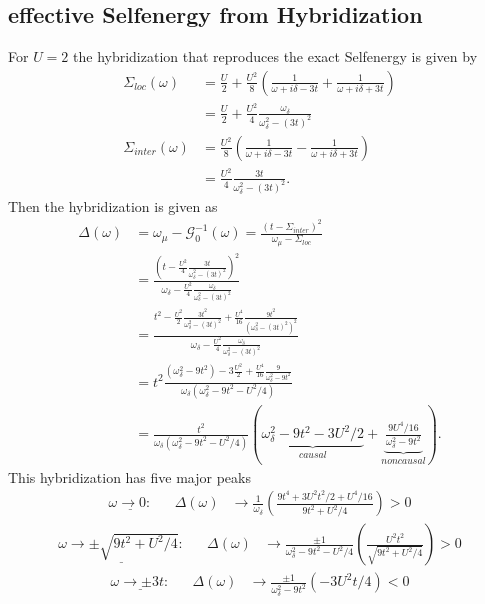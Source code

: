 \documentclass[12pt,a4paper]{scrartcl}
\numberwithin{equation}{section}
\begin{document}
\subsection{effective Selfenergy from Hybridization}
For $U=2$ the hybridization that reproduces the exact Selfenergy is given by
\begin{align}
 \Sigma_{loc}(\omega)
 &= \frac{U}{2} + \frac{U^2}{8}\left( \frac{1}{\omega+i\delta-3t} +  \frac{1}{\omega+i\delta+3t} \right) \nonumber\\
 &= \frac{U}{2} + \frac{U^2}{4} \frac{\omega_{\delta} }{ \omega^2_{\delta} -(3t)^2}  \\
 \Sigma_{inter}(\omega)
 &= \frac{U^2}{8} \left( \frac{1}{\omega+i\delta-3t} -  \frac{1}{\omega+i\delta+3t} \right)  \nonumber\\
    &= \frac{U^2}{4} \frac{ 3t }{ \omega^2_{\delta} -(3t)^2}.
\end{align}
Then the hybridization is given as
\begin{align}
 \Delta(\omega) &= \omega_{\mu} - \mathcal{G}^{-1}_0(\omega)  
 = \frac{ (t-\Sigma_{inter})^2 }{\omega_{\mu}-\Sigma_{loc}} \nonumber\\
 &= \frac{ \left( t - \frac{U^2}{4} \frac{ 3t }{ \omega^2_{\delta} -(3t)^2} \right)^2 }
           {\omega_{\delta}- \frac{U^2}{4} \frac{\omega_{\delta} }{ \omega^2_{\delta} -(3t)^2} } \nonumber\\
&= \frac{ t^2 -\frac{U^2}{2} \frac{ 3t^2 }{ \omega^2_{\delta} -(3t)^2}  + \frac{U^4}{16} \frac{ 9t^2 }{ ( \omega^2_{\delta} -(3t)^2 )^2 }  }
           {\omega_{\delta}- \frac{U^2}{4} \frac{  \omega_{\delta} }{  \omega^2_{\delta} -(3t)^2  }  } \nonumber\\
%
&= t^2 \frac{ (\omega^2_{\delta} -9t^2) - 3 \frac{U^2}{2}    + \frac{U^4}{16} \frac{ 9 }{ \omega^2_{\delta} -9t^2  }  }
           {\omega_{\delta} \left( \omega^2_{\delta} -9t^2 - U^2/4  \right)  } \nonumber\\
%
&= \frac{ t^2 }{\omega_{\delta} \left( \omega^2_{\delta} -9t^2 - U^2/4  \right)  }
\left( 
\underbrace{  \omega^2_{\delta} -9t^2  -3U^2/2  }_{causal}
 +\underbrace{ \frac{ 9 U^4 /16 }{ \omega^2_{\delta} -9t^2   }  }_{noncausal}  \right) .
\end{align}
This hybridization has five major peaks
\begin{align}
 \underline{\omega \rightarrow 0:} &&  
  \Delta(\omega) &\rightarrow \frac{1}{\omega_{\delta}}
                 \left( 
                 \frac{ 9t^4 + 3U^2t^2/2 + U^4/16}{9t^2 + U^2/4}
                 \right) > 0
\end{align}
\begin{align}
 \underline{\omega \rightarrow \pm \sqrt{9t^2 + U^2/4}:} &&  
  \Delta(\omega) &\rightarrow \frac{\pm1}{ \omega^2_{\delta} -9t^2 - U^2/4}
                \left( \frac{ U^2 t^2}{\sqrt{9t^2 + U^2/4} } \right) > 0
\end{align}
\begin{align}
 \underline{\omega \rightarrow \pm 3t:} &&  
  \Delta(\omega) 
  &\rightarrow 
    \frac{ \pm1 }{ \omega^2_{\delta} -9t^2   } \left( - 3 U^2 t /4  \right)  < 0
\end{align}
\end{document}
